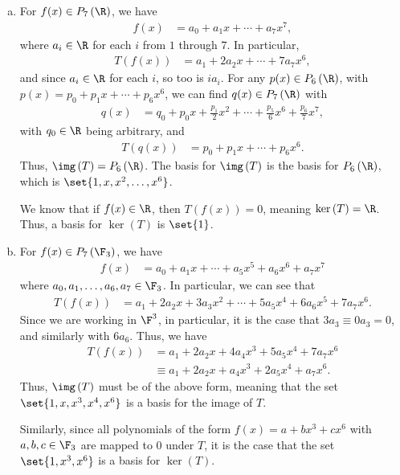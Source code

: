 \documentclass[12pt]{mypackage}
\begin{document}
\begin{solution}\hfill
  \begin{enumerate}[(a)]
    \item For $f(x)\in P_{7}\left(\R\right)$, we have
      \begin{align*}
        f(x) &= a_0 + a_1x + \cdots + a_7x^{7},
      \end{align*}
      where $a_i\in \R$ for each $i$ from $1$ through $7$. In particular,
      \begin{align*}
        T\left(f(x)\right) &= a_1 + 2a_2x + \cdots + 7a_7x^{6},
      \end{align*}
      and since $a_{i}\in \R$ for each $i$, so too is $ia_{i}$. For any $p(x)\in P_{6}\left(\R\right)$, with $p(x) = p_0 + p_1x + \cdots + p_{6}x^{6}$, we can find $q(x)\in P_{7}\left(\R\right)$ with
      \begin{align*}
        q(x) &= q_0 + p_0x + \frac{p_1}{2}x^2 + \cdots + \frac{p_5}{6}x^{6} + \frac{p_6}{7}x^{7},
      \end{align*}
      with $q_0\in \R$ being arbitrary, and
      \begin{align*}
        T\left(q(x)\right) &= p_0 + p_1 x + \cdots + p_6x^{6}.
      \end{align*}
      Thus, $\img\left(T\right) = P_6\left(\R\right)$. The basis for $\img\left(T\right)$ is the basis for $P_{6}\left(\R\right)$, which is $\set{1,x,x^2,\dots,x^{6}}$.\newline

      We know that if $f(x)\in \R$, then $T\left(f(x)\right) = 0$, meaning $\ker\left(T\right) = \R$. Thus, a basis for $\ker\left(T\right)$ is $\set{1}$.
    \item For $f(x) \in P_{7}\left(\F_3\right)$, we have
      \begin{align*}
        f(x) &= a_0 + a_1 x + \cdots + a_{5}x^{5} + a_6x^{6} + a_7x^{7}
      \end{align*}
      where $a_0,a_1,\dots,a_6,a_7\in \F_3$. In particular, we can see that
      \begin{align*}
        T\left(f(x)\right) &= a_1 + 2a_2x + 3a_3x^2 + \cdots + 5a_5x^4 + 6a_6x^5 + 7a_7x^{6}.
      \end{align*}
      Since we are working in $\F^{3}$, in particular, it is the case that $3a_3 \equiv 0a_3 = 0$, and similarly with $6a_6$. Thus, we have
      \begin{align*}
        T\left(f(x)\right) &= a_1 + 2a_2x + 4a_4x^3 + 5a_5x^4 + 7a_7x^6\\
                           &\equiv a_1 + 2a_2x + a_4x^3 + 2a_5x^4 + a_7x^6.
      \end{align*}
      Thus, $\img\left(T\right)$ must be of the above form, meaning that the set $\set{1,x,x^3,x^4,x^6}$ is a basis for the image of $T$.\newline

      Similarly, since all polynomials of the form $f(x) = a + bx^3 + cx^6$ with $a,b,c\in \F_3$ are mapped to $0$ under $T$, it is the case that the set $\set{1,x^3,x^6}$ is a basis for $\ker\left(T\right)$.
  \end{enumerate}
\end{solution}
\end{document}
